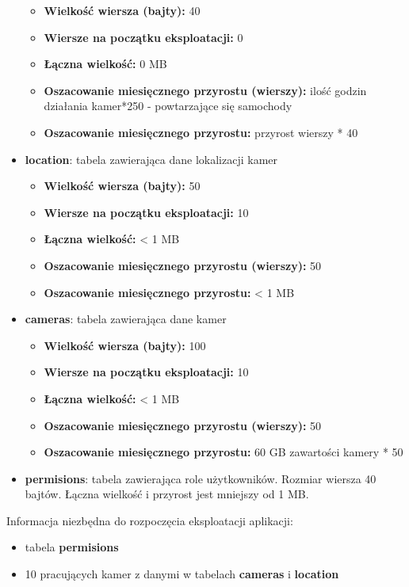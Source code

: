 \documentclass[12pt]{article}
\begin{document}
\begin{itemize}
\begin{itemize}
		\item \textbf{Wielkość wiersza (bajty):} 40
		\item \textbf{Wiersze na początku eksploatacji:} 0
		\item \textbf{Łączna wielkość:} 0 MB
		\item \textbf{Oszacowanie miesięcznego przyrostu (wierszy):} ilość godzin działania kamer*250 - powtarzające się samochody
		\item \textbf{Oszacowanie miesięcznego przyrostu:} przyrost wierszy * 40 
	\end{itemize}
\item \textbf{location}: tabela zawierająca dane lokalizacji kamer
	\begin{itemize}
		\item \textbf{Wielkość wiersza (bajty):} 50
		\item \textbf{Wiersze na początku eksploatacji:} 10
		\item \textbf{Łączna wielkość:} < 1 MB
		\item \textbf{Oszacowanie miesięcznego przyrostu (wierszy):} 50
		\item \textbf{Oszacowanie miesięcznego przyrostu:} < 1 MB
	\end{itemize}
\item \textbf{cameras}: tabela zawierająca dane kamer
	\begin{itemize}
		\item \textbf{Wielkość wiersza (bajty):} 100
		\item \textbf{Wiersze na początku eksploatacji:} 10
		\item \textbf{Łączna wielkość:} < 1 MB
		\item \textbf{Oszacowanie miesięcznego przyrostu (wierszy):} 50
		\item \textbf{Oszacowanie miesięcznego przyrostu:} 60 GB zawartości kamery * 50
	\end{itemize}
\item \textbf{permisions}: tabela zawierająca role użytkowników. Rozmiar wiersza 40 bajtów.  Łączna wielkość i przyrost jest mniejszy od 1 MB. 
\end{itemize}

Informacja niezbędna do rozpoczęcia eksploatacji aplikacji:
\begin{itemize}
\item tabela \textbf{permisions}
\item 10 pracujących kamer z danymi w tabelach \textbf{cameras} i \textbf{location}
\end{itemize}
\end{document}
